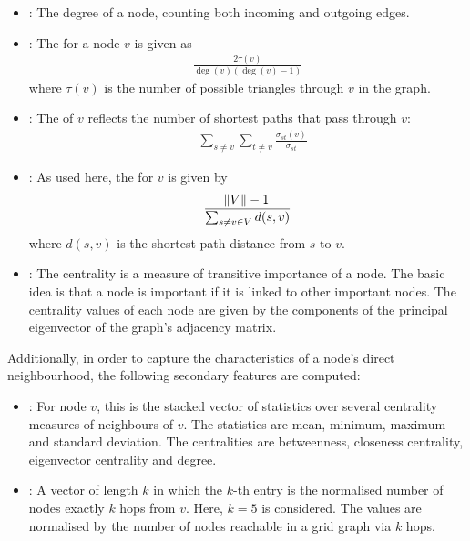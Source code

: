 \documentclass[
	fontsize=10pt, %
	twoside=false, %
	secnumdepth=1, %
  toc=indentunnumbered %
]{kaobook}
\begin{document}
\begin{itemize}
\item {}: The degree of a node, counting both incoming and
  outgoing edges.
\item {}: The 
  \cite{brandes_NetworkAnalysisMethodological_2005}
  for a
  node $v$ is given as
  \begin{align*}
    \frac{2 \tau(v)}{\deg(v)(\deg(v)-1)}
  \end{align*}
  where $\tau(v)$ is the number of possible triangles through $v$ in the graph.
\item {}: The  of $v$
  reflects the number of shortest paths that pass through $v$:
  \begin{align*}
    & \sum_{s \not= v} \sum_{t \not= v} \frac{\sigma_{st}(v)}{\sigma_{st}}
  \end{align*}
\item {}: As used here, the  for $v$ is given by
  \begin{align*}
    \frac{\norm{V}-1}{\sum_{s \not= v \in V} d(s,v)}
  \end{align*}
  where $d(s,v)$ is the shortest-path distance from $s$ to $v$.
\item {}: The  centrality is a
  measure of transitive importance of a node. The basic idea is that a node is
  important if it is linked to other important nodes. The centrality values of
  each node are given by the components of the principal eigenvector of the graph's
  adjacency matrix.
\end{itemize}

Additionally, in order to capture the characteristics of a node's direct
neighbourhood, the following secondary features are computed:
\begin{itemize}
\item {}: For node $v$, this is the stacked
  vector of statistics over several centrality measures of neighbours of $v$.
  The statistics are mean, minimum, maximum and standard deviation. The
  centralities are betweenness, closeness centrality, eigenvector centrality and degree.
\item {}: A vector of length $k$ in which the $k$-th
  entry is the normalised number of nodes exactly $k$ hops from $v$. Here, $k=5$
  is considered. The values are normalised by the number of nodes reachable in a
  grid graph via $k$ hops.
\end{itemize}
\end{document}
